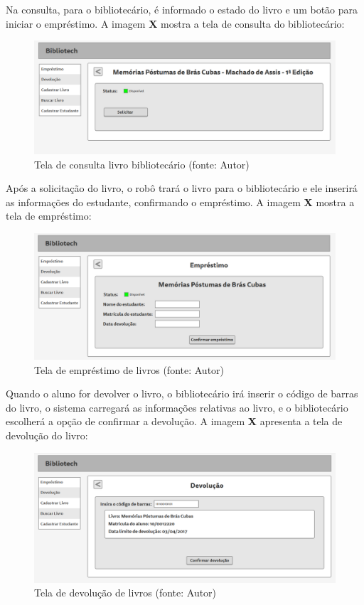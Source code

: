 Na consulta, para o bibliotecário, é informado o estado do livro e um botão para iniciar o empréstimo. A imagem \textbf{X} mostra a tela de consulta do bibliotecário:

\begin{figure}[!h]
\centering
\includegraphics[scale=0.40, angle = 360]{figuras/prototipo9}
\caption[]{Tela de consulta livro bibliotecário (fonte: Autor)}
\end{figure}
\FloatBarrier

Após a solicitação do livro, o robô trará o livro para o bibliotecário e ele inserirá as informações do estudante, confirmando o empréstimo. A imagem \textbf{X} mostra a tela de empréstimo:

\begin{figure}[!h]
\centering
\includegraphics[scale=0.40, angle = 360]{figuras/prototipo10}
\caption[]{Tela de empréstimo de livros (fonte: Autor)}
\end{figure}
\FloatBarrier

Quando o aluno for devolver o livro, o bibliotecário irá inserir o código de barras do livro, o sistema carregará as informações relativas ao livro, e o bibliotecário escolherá a opção de confirmar a devolução. A imagem \textbf{X} apresenta a tela de devolução do livro:

\begin{figure}[!h]
\centering
\includegraphics[scale=0.40, angle = 360]{figuras/prototipo11}
\caption[]{Tela de devolução de livros (fonte: Autor)}
\end{figure}
\FloatBarrier